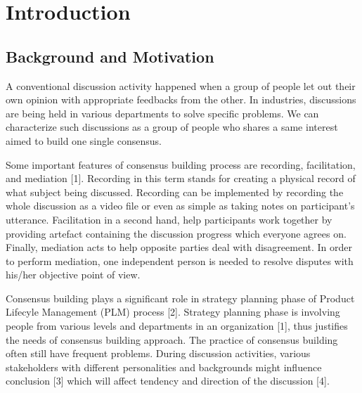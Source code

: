 \documentclass[senior]{IPSstyle}
\begin{document}
\makepreliminarypages
\singlespace
\frontmatter
\tableofcontents
\listoffigures
\listoftables
\mainmatter
\clearemptydoublepage
\setlength{\baselineskip}{23.0pt}

\chapter{Introduction} 

\section{Background and Motivation}

A conventional discussion activity happened when a group of people let out their own opinion with appropriate feedbacks from the other. In industries, discussions are being held in various departments to solve specific problems. We can characterize such discussions as a group of people who shares a same interest aimed to build one single consensus.

Some important features of consensus building process are recording, facilitation, and mediation [1]. Recording in this term stands for creating a physical record of what subject being discussed. Recording can be implemented by recording the whole discussion as a video file or even as simple as taking notes on participant’s utterance. Facilitation in a second hand, help participants work together by providing artefact containing the discussion progress which everyone agrees on. Finally, mediation acts to help opposite parties deal with disagreement. In order to perform mediation, one independent person is needed to resolve disputes with his/her objective point of view.

Consensus building plays a significant role in strategy planning phase of Product Lifecyle Management (PLM) process [2]. Strategy planning phase is involving people from various levels and departments in an organization [1], thus justifies the needs of consensus building approach. The practice of consensus building often still have frequent problems. During discussion activities, various stakeholders with different personalities and backgrounds might influence conclusion [3] which will affect tendency and direction of the discussion [4].
\end{document}
